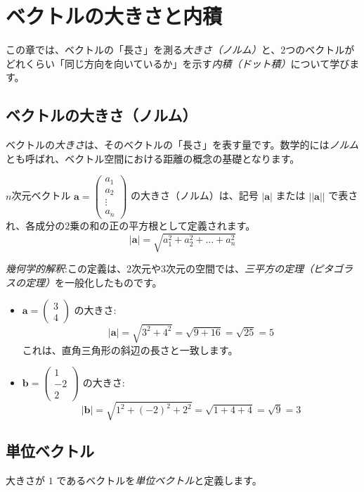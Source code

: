 \section{ベクトルの大きさと内積}
この章では、ベクトルの「長さ」を測る\emph{大きさ（ノルム）}と、2つのベクトルがどれくらい「同じ方向を向いているか」を示す\emph{内積（ドット積）}について学びます。
\subsection{ベクトルの大きさ（ノルム）}
ベクトルの\emph{大きさ}は、そのベクトルの「長さ」を表す量です。数学的には\emph{ノルム}とも呼ばれ、ベクトル空間における距離の概念の基礎となります。
\begin{dfn}
$n$次元ベクトル $\bm{a} = \begin{pmatrix} a_1 \\ a_2 \\ \vdots \\ a_n \end{pmatrix}$ の大きさ（ノルム）は、記号 $|\bm{a}|$ または $||\bm{a}||$ で表され、各成分の2乗の和の正の平方根として定義されます。
\[|\bm{a}| = \sqrt{a_1^2 + a_2^2 + \dots + a_n^2}\]
\end{dfn}

\emph{幾何学的解釈}:この定義は、2次元や3次元の空間では、\emph{三平方の定理（ピタゴラスの定理）}を一般化したものです。

\begin{ex}
\begin{itemize}
\item $\bm{a} = \begin{pmatrix} 3 \\ 4 \end{pmatrix}$ の大きさ:
    \[|\bm{a}| = \sqrt{3^2 + 4^2} = \sqrt{9 + 16} = \sqrt{25} = 5\]
    これは、直角三角形の斜辺の長さと一致します。
\item $\bm{b} = \begin{pmatrix} 1 \\ -2 \\ 2 \end{pmatrix}$ の大きさ:
    \[|\bm{b}| = \sqrt{1^2 + (-2)^2 + 2^2} = \sqrt{1 + 4 + 4} = \sqrt{9} = 3\]
\end{itemize}
\end{ex}

\subsection{単位ベクトル}
\begin{dfn}[単位ベクトル] \label{unit_vector}
大きさが $1$ であるベクトルを\emph{単位ベクトル}と定義します。
\end{dfn}

